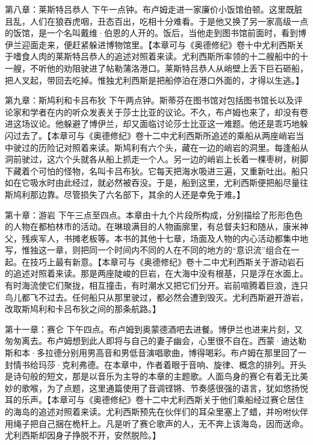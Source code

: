 \par 第八章：莱斯特吕恭人 下午一点钟。布卢姆走进一家廉价小饭馆伯顿。这里既脏且乱，人们在狼吞虎咽，丑态百出，吃相十分难看。于是他又换了另一家高级一点的饭馆，是一个名叫戴维·伯恩的人开的。饭后，当他走到图书馆前面时，看到博伊兰迎面走来，便赶紧躲进博物馆里。【本章可与《奥德修纪》卷十中尤利西斯关于嗜食人肉的莱斯特吕恭人的追述对照着来读。尤利西斯所率领的十二艘船中的十一艘，不听他的劝阻驶进了帖勒蒲洛港口。莱斯特吕恭人从峭壁上丢下巨石砸船，把人叉起，带回去吃掉。惟独尤利西斯是把船停泊在港口外面的，才得以生逃。】
\par 第九章：斯鸠利和卡吕布狄 下午两点钟。斯蒂芬在图书馆对包括图书馆长以及评论家和学者在内的听众发表关于莎士比亚的议论。不久，布卢姆也来了，却没有卷进这场议论。他躲避了博伊兰，却又面临讨论莎士比亚这一难题。他还是乖巧地躲闪过去了。【本章可与《奥德修纪》卷十二中尤利西斯所追述的乘船从两座峭岩当中驶过的历险记对照着来读。斯鸠利有六个头，藏在一边的峭岩的洞里。每逢船从洞前驶过，这六个头就各从船上抓走一个人。另一边的峭岩上长着一棵枣树，树脚下藏着个可怕的怪物，名叫卡吕布狄。它每天把海水吸进三遍，又重新吐出。船只如在它吸水时由此经过，就必然被吞没。于是，船到这里，尤利西斯便把船尽量往斯鸠利那边靠。尽管损失了六名部下，其余的人还是幸免于难。】
\par 第十章：游岩 下午三点至四点。本章由十九个片段所构成，分别描绘了形形色色的人物在都柏林市的活动。在琳琅满目的人物画廓里，有总督夫妇和随从，康米神父，残疾军人，书摊老板等。本书的其他十七章，场面及人物的内心活动都集中地写，惟独这一章，则把同一个时间内不同的人在不同的地方的“意识流”组合在一起。在技巧上最有新意。【本章可与《奥德修纪》卷十二中尤利西斯关于游动岩石的追述对照着来读。那是两座陡峻的巨岩，在大海中没有根基，只是浮在水面上。有时海流使它们聚拢，相互撞击，有时潮水又把它们分开。岩前喧腾着巨浪，连只鸟儿都飞不过去。任何船只从那里驶过，都必然会遭到毁灭。尤利西斯避开游岩，改取斯鸠利和卡吕布狄之间的那条航路。】
\par 第十一章：赛仑 下午四点。布卢姆到奥蒙德酒吧去进餐。博伊兰也进来片刻，又匆匆离去。布卢姆想到此人即将与自己的妻子幽会，心里很不自在。西蒙·迪达勒斯和本·多拉德分别用男高音和男低音演唱歌曲，博得喝彩。布卢姆在那里回了一封情书给玛莎·克利弗德。在本章中，作者着眼于音响、旋律、概念的排列。开头是诗句般的短文，那是以音乐为主导的本章的主题歌。人面鸟身的赛仑有着无比美妙的歌喉，为了点题，这里通篇使用了音调铿锵、节奏感很强的语言，犹如悠扬悦耳的乐声。【本章可与《奥德修纪》卷十二中尤利西斯关于他们乘船经过赛仑居住的海岛的追述对照着来读。尤利西斯预先在伙伴们的耳朵里塞上了蜡，并吩咐伙伴用绳子把自己捆在桅杆上。凡是听了赛仑歌声的人，无不奔上该海岛，因而送命。尤利西斯却因身子挣脱不开，安然脱险。】
